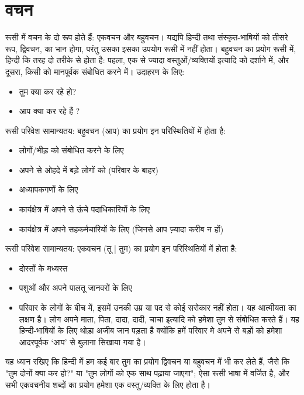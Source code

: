 \section{वचन}\label{sec:intro-plurals}
  रूसी में वचन के दो रूप होते हैं: एकवचन और बहुवचन। यद्यपि हिन्दी तथा संस्कृत-भाषियों को तीसरे रूप, द्विवचन, का भान होगा, परंतु उसका इसका उपयोग रूसी में नहीं होता।
  बहुवचन का प्रयोग रूसी में, हिन्दी कि तरह दो तरीके से होता है: पहला, एक से ज्यादा वस्तुओं/व्यक्तियों इत्यादि को दर्शाने में, और दूसरा, किसी को मानपूर्वक संबोधित करने में।
  उदाहरण के लिए:
  \begin{itemize}
    \item  {}\par तुम क्या कर रहे हो?
    \item  {}\par आप क्या कर रहे हैं ?
  \end{itemize}


  रूसी परिवेश सामान्यतय: बहुवचन  (आप) का प्रयोग इन परिस्थितियों में होता है:
  \begin{itemize}
    \item लोगों/भीड़ को संबोधित करने के लिए
    \item अपने से ओहदे में बड़े लोगों को (परिवार के बाहर)
    \item अध्यापकगणों के लिए
    \item कार्यक्षेत्र में अपने से ऊंचे पदाधिकारियों के लिए
    \item कार्यक्षेत्र में अपने सहकर्मचारियों के लिए (जिनसे आप ज़्यादा करीब न हों)
  \end{itemize}

  रूसी परिवेश सामान्यतय: एकवचन  (तू | तुम) का प्रयोग इन परिस्थितियों में होता है:
  \begin{itemize}
    \item दोस्तों के मध्यस्त
    \item पशुओं और अपने पालतू जानवरों के लिए
    \item  परिवार के लोगों के बीच में, इसमें उनकी उम्र या पद से कोई सरोकार नहीं होता। यह आत्मीयता का लक्षण है। लोग अपने माता, पिता,
    दादा, दादी, चाचा इत्यादि को हमेशा तुम से संबोधित करते हैं। यह हिन्दी-भाषियों के लिए थोड़ा अजीब जान पड़ता है क्योंकि हमें परिवार मे अपने से बड़ों को हमेशा आदरपूर्वक `आप'
    से बुलाना सिखाया गया है।
  \end{itemize}
  यह ध्यान रखिए कि हिन्दी में हम कई बार तुम का प्रयोग द्विवचन या बहुवचन में भी कर लेते हैं, जैसे कि "तुम दोनों क्या कर हो?" या "तुम लोगों को एक साथ पढ़ाया जाएगा";
  ऐसा रूसी भाषा में वर्जित है,  और सभी एकवचनीय शब्दों का प्रयोग हमेशा एक वस्तु/व्यक्ति के लिए होता है।
